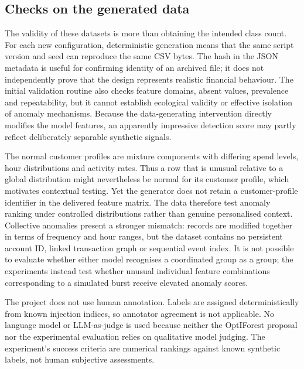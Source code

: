 \documentclass[11pt]{article}
\begin{document}
\subsection{Checks on the generated data}
The validity of these datasets is more than obtaining the intended class count. For each new configuration, deterministic generation means that the same script version and seed can reproduce the same CSV bytes. The hash in the JSON metadata is useful for confirming identity of an archived file; it does not independently prove that the design represents realistic financial behaviour. The initial validation routine also checks feature domains, absent values, prevalence and repeatability, but it cannot establish ecological validity or effective isolation of anomaly mechanisms. Because the data-generating intervention directly modifies the model features, an apparently impressive detection score may partly reflect deliberately separable synthetic signals.
 
The normal customer profiles are mixture components with differing spend levels, hour distributions and activity rates. Thus a row that is unusual relative to a global distribution might nevertheless be normal for its customer profile, which motivates contextual testing. Yet the generator does not retain a customer-profile identifier in the delivered feature matrix. The data therefore test anomaly ranking under controlled distributions rather than genuine personalised context. Collective anomalies present a stronger mismatch: records are modified together in terms of frequency and hour ranges, but the dataset contains no persistent account ID, linked transaction graph or sequential event index. It is not possible to evaluate whether either model recognises a coordinated group as a group; the experiments instead test whether unusual individual feature combinations corresponding to a simulated burst receive elevated anomaly scores.
 
The project does not use human annotation. Labels are assigned deterministically from known injection indices, so annotator agreement is not applicable. No language model or LLM-as-judge is used because neither the OptIForest proposal nor the experimental evaluation relies on qualitative model judging. The experiment's success criteria are numerical rankings against known synthetic labels, not human subjective assessments.
 
\end{document}
